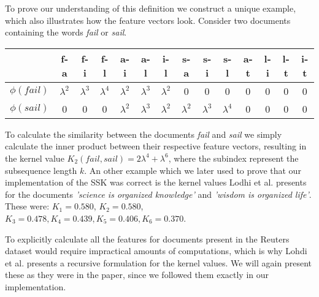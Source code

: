 To prove our understanding of this definition we construct a unique example, which also illustrates how the feature vectors look. Consider two documents containing the words \textit{fail} or \textit{sail}. 

\vspace{10pt}
\begin{centering}
\begin{tabular}{|c|c|c|c|c|c|c|c|c|c|c|c|c|c|}
	\hline 
	& f-a & f-i & f-l & a-i & a-l & i-l & s-a & s-i & s-l & a-t & l-i & l-t & i-t \\ 
	\hline 
	$\phi(fail)$ & $ \lambda^2 $ & $ \lambda^3 $ &$ \lambda^4 $  &  $ \lambda^2 $& $ \lambda^3 $  & $ \lambda^2 $ & 0 & 0 & 0 & 0 & 0 & 0 & 0 \\ 
	\hline 
	$\phi(sail)$ & 0 & 0 & 0 & $\lambda^2$ & $\lambda^3$ & $\lambda^2$ & $\lambda^2$ & $\lambda^3$ & $\lambda^4$ & 0 & 0 & 0 & 0 \\ 
	\hline 

\end{tabular} 
\end{centering}

\vspace{10pt}
To calculate the similarity between the documents \textit{fail} and \textit{sail} we simply calculate the inner product between their respective feature vectors, resulting in the kernel value $ K_2(fail,sail)  = 2\lambda^4 + \lambda^6 $, where the subindex represent the subsequence length $ k $. An other example which we later used to prove that our implementation of the SSK was correct is the kernel values Lodhi et al. presents for the documents \textit{'science is organized knowledge'} and \textit{'wisdom is organized life'}. These were: $ K_1 = 0.580 $, $ K_2 = 0.580$, $ K_3 = 0.478, K_4=0.439, K_5 = 0.406, K_6 = 0.370 $.

To explicitly calculate all the features for documents present in the Reuters dataset would require impractical amounts of computations, which is why Lohdi et al. presents a recursive formulation for the kernel values. We will again present these as they were in the paper, since we followed them exactly in our implementation. 

